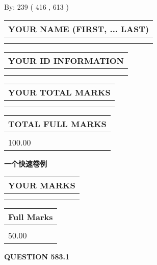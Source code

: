 \documentclass{ctexart}
\begin{document}
   
\hspace{1.0in} By: 
 239 ( 416 ,  613 )
   
   
   
   
\newpage 
\setcounter{page}{ 
   583001 } 
   
   
   
   
\noindent\begin{tabular}{|l|}
\hline
YOUR NAME (FIRST, ... LAST)  \\
\hline
 \\ 
 \\ 
\hline
\end{tabular}
\hspace{0.05in} \begin{tabular}{|l|}
\hline
 YOUR   ID   INFORMATION  \\
\hline
 \\ 
 \\ 
\hline
\end{tabular}
   
   
\vspace{0.2in}\noindent\begin{tabular}{|l|}
\hline
YOUR TOTAL MARKS  \\
\hline
 \\ 
 \\ 
\hline
\end{tabular}
\hspace{0.05in} \begin{tabular}{|l|}
\hline
TOTAL FULL MARKS  \\
\hline
 \\ 
100.00 \\
\hline
\end{tabular}
   
   
 \vspace{0.2in}
{\LARGE {\textbf{ 一个快速卷例}}}
   
   
  
\vspace{0.2in}
  
\noindent\begin{tabular}{|l|}
\hline
 YOUR MARKS  \\
\hline
 \\ 
 \\ 
\hline
\end{tabular}
\hspace{0.05in} \begin{tabular}{|l|}
\hline
 Full Marks  \\
\hline
 \\ 
50.00 \\
\hline
\end{tabular}
{\textbf{\Large{QUESTION
583.1 
}}}
  
\end{document}

